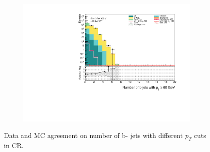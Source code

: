 \documentclass[12pt, a4paper]{book}
\begin{document}
\begin{figure}[!ht]
\begin{subfigure}[b]{0.49\textwidth}
        \includegraphics[width=\textwidth]{bjetsPt60.pdf}
    \end{subfigure}
    \caption{Data and MC agreement on number of b- jets with different $p_T$ cuts in CR.}
\end{figure}
\end{document}
